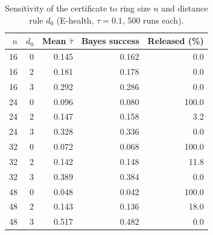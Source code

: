 \begin{table}[htbp]
\centering
\caption{Sensitivity of the certificate to ring size $n$ and distance rule $d_0$ (E-health, $\tau=0.1$, 500 runs each).}
\label{tab:sensitivity}
\small
\begin{tabular}{rrrrr}
\toprule
$n$ & $d_0$ & Mean $\hat{\tau}$ & Bayes success & Released (\%)\\
\midrule
16 & 0 & 0.145 & 0.162 & 0.0 \\
16 & 2 & 0.181 & 0.178 & 0.0 \\
16 & 3 & 0.292 & 0.286 & 0.0 \\
24 & 0 & 0.096 & 0.080 & 100.0 \\
24 & 2 & 0.147 & 0.158 & 3.2 \\
24 & 3 & 0.328 & 0.336 & 0.0 \\
32 & 0 & 0.072 & 0.068 & 100.0 \\
32 & 2 & 0.142 & 0.148 & 11.8 \\
32 & 3 & 0.389 & 0.384 & 0.0 \\
48 & 0 & 0.048 & 0.042 & 100.0 \\
48 & 2 & 0.143 & 0.136 & 18.0 \\
48 & 3 & 0.517 & 0.482 & 0.0 \\
\bottomrule
\end{tabular}
\end{table}
